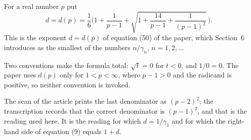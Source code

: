 \begin{definition}
For a real number $p$ put
\[
  d=d(p)=\frac16\Biggl(1+\frac1{p-1}+\sqrt{1+\frac{14}{p-1}+\frac1{(p-1)^2}}\,\Biggr).
\]
This is the exponent $d=d(p)$ of equation (50) of the paper, which Section~6
introduces as the smallest of the numbers $n/\gamma_n$, $n=1,2,\dots$

Two conventions make the formula total: $\sqrt t=0$ for $t<0$, and $1/0=0$.
The paper uses $d(p)$ only for $1<p<\infty$, where $p-1>0$ and the radicand is
positive, so neither convention is invoked.

The scan of the article prints the last denominator as $(p-2)^2$; the
transcription records that the correct denominator is $(p-1)^2$, and that is
the reading used here.  It is the reading for which $d=1/\gamma_1$ and for
which the right-hand side of equation (9) equals $1+d$.
\end{definition}
